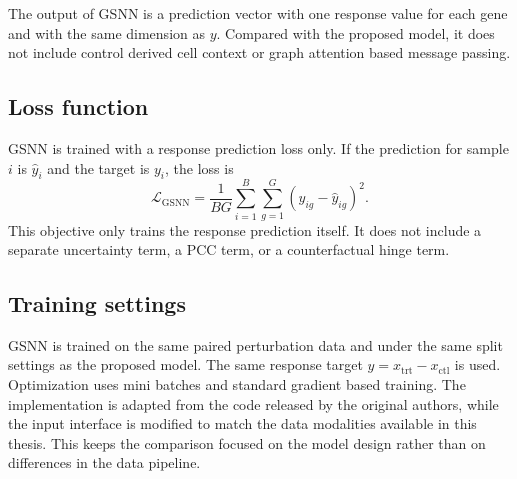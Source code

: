 \noindent The output of GSNN is a prediction vector with one response value for each gene and with the same dimension as $y$. Compared with the proposed model, it does not include control derived cell context or graph attention based message passing.

\subsection{Loss function}
\noindent GSNN is trained with a response prediction loss only. If the prediction for sample $i$ is $\hat{y}_{i}$ and the target is $y_{i}$, the loss is
\begin{equation}
\mathcal{L}_{\mathrm{GSNN}}=\frac{1}{BG}\sum_{i=1}^{B}\sum_{g=1}^{G}(y_{ig}-\hat{y}_{ig})^{2}.
\end{equation}
\noindent This objective only trains the response prediction itself. It does not include a separate uncertainty term, a PCC term, or a counterfactual hinge term.

\subsection{Training settings}
\noindent GSNN is trained on the same paired perturbation data and under the same split settings as the proposed model. The same response target $y = x_{\mathrm{trt}} - x_{\mathrm{ctl}}$ is used. Optimization uses mini batches and standard gradient based training. The implementation is adapted from the code released by the original authors, while the input interface is modified to match the data modalities available in this thesis. This keeps the comparison focused on the model design rather than on differences in the data pipeline.

